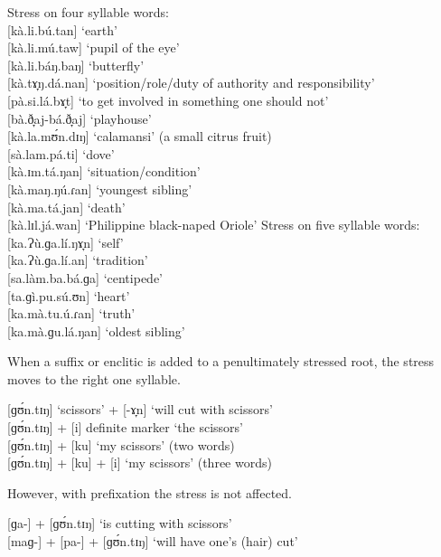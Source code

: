 \ea
\label{4syllable}
Stress on four syllable words: \\
{}[kà.li.bú.tan] ‘earth’ \\
{}[kà.li.mú.taw] ‘pupil of the eye’ \\
{}[kà.li.báŋ.baŋ] ‘butterfly’ \\
{}[kà.tɤ̞ŋ.dá.nan] ‘position/role/duty of authority and responsibility’ \\
{}[pà.si.lá.bɤ̞t] ‘to get involved in something one should not’ \\
{}[bà.ð̞aj-bá.ð̞aj] ‘playhouse’ \\
{}[kà.la.mʊ́n.dɪŋ] ‘calamansi’ (a small citrus fruit) \\
{}[sà.lam.pá.ti] ‘dove’ \\
{}[kà.ɪm.tá.ŋan] ‘situation/condition’ \\
{}[kà.maŋ.ŋú.ɾan] ‘youngest sibling’ \\
{}[kà.ma.tá.jan] ‘death’ \\
{}[kà.lɪl.já.wan] ‘Philippine black-naped Oriole’
\ex
\label{5syllable}
Stress on five syllable words: \\
{}[ka.Ɂù.ɡa.lí.ŋɤ̞n] ‘self’ \\
{}[ka.Ɂù.ɡa.lí.an] ‘tradition’ \\
{}[sa.làm.ba.bá.ɡa] ‘centipede’ \\
{}[ta.ɡì.pu.sú.ʊn] ‘heart’ \\
{}[ka.mà.tu.ú.ɾan] ‘truth’ \\
{}[ka.mà.ɡu.lá.ŋan] ‘oldest sibling’
\z

When a suffix or enclitic is added to a penultimately stressed root, the stress moves to the right one syllable.

\ea
{}   [ɡʊ́n.tɪŋ] ‘scissors’ + [-ɤ̞n] \rightarrow [ɡʊn.tí.ŋɤ̞n] ‘will cut with scissors’ \\
{}   [ɡʊ́n.tɪŋ] + [i] definite marker \rightarrow [ɡʊn.tɪ́ŋ.ᵑi] ‘the scissors’ \\
{}   [ɡʊ́n.tɪŋ] + [ku] \rightarrow [ɡʊn.tɪ́ŋ ku] ‘my scissors’ (two words) \\
{}   [ɡʊ́n.tɪŋ] + [ku] + [i] \rightarrow [ɡʊntɪ́ŋ ku ʷi] ‘my scissors’ (three words)
\z

However, with prefixation the stress is not affected.

\ea
{}[ɡa-] + [ɡʊ́n.tɪŋ] \rightarrow [ɡa.ɡʊ́n.tɪŋ] ‘is cutting with scissors’ \\
{}[maɡ-] + [pa-] + [ɡʊ́n.tɪŋ]  ‘will have one’s (hair) cut’
\z

